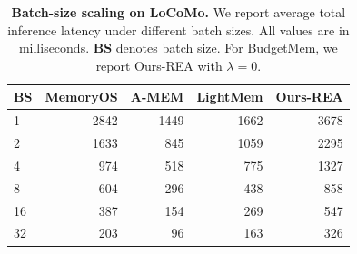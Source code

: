 \begin{table}[h]
    \centering
    \footnotesize
    \caption{\textbf{Batch-size scaling on LoCoMo.}
    We report average total inference latency under different batch sizes. 
    All values are in milliseconds. 
    \textbf{BS} denotes batch size. 
    For BudgetMem, we report Ours-REA with $\lambda=0$.}
    \label{tab:latency_locomo_batch}
    \begin{tabular}{@{}lrrrr@{}}
        \toprule
        \textbf{BS} & \textbf{MemoryOS} & \textbf{A-MEM} & \textbf{LightMem} & \textbf{Ours-REA} \\
        \midrule
        1  & 2842 & 1449 & 1662 & 3678 \\
        2  & 1633 & 845  & 1059 & 2295 \\
        4  & 974  & 518  & 775  & 1327 \\
        8  & 604  & 296  & 438  & 858  \\
        16 & 387  & 154  & 269  & 547  \\
        32 & 203  & 96   & 163  & 326  \\
        \bottomrule
    \end{tabular}
\end{table}